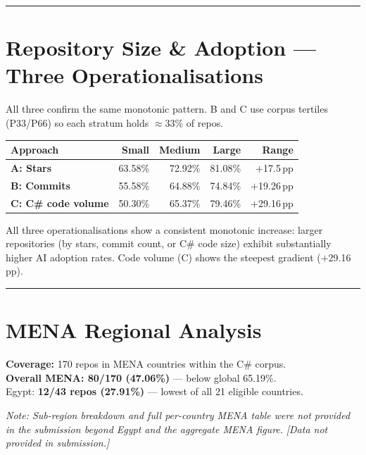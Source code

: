 \documentclass[10pt,a4paper]{article}
\begin{document}
\vspace{6pt}
\hrule
\vspace{6pt}

\newpage
\section*{Repository Size \& Adoption --- Three Operationalisations}

All three confirm the same monotonic pattern. B and C use corpus tertiles
(P33/P66) so each stratum holds $\approx$33\% of repos.

\vspace{3pt}
\begin{tabular}{@{}p{6.2cm}rrrr@{}}
\toprule
Approach & Small & Medium & Large & Range \\
\midrule
\textbf{A: Stars}
  & 63.58\% & 72.92\% & 81.08\% & $+$17.5\,pp \\[5pt]
\textbf{B: Commits}
  & 55.58\% & 64.88\% & 74.84\% & $+$19.26\,pp \\[5pt]
\textbf{C: C\# code volume}
  & 50.30\% & 65.37\% & 79.46\% & $+$29.16\,pp \\
\bottomrule
\end{tabular}

\vspace{4pt}
{\small All three operationalisations show a consistent monotonic increase:
larger repositories (by stars, commit count, or C\# code size) exhibit substantially
higher AI adoption rates. Code volume (C) shows the steepest gradient ($+$29.16\,pp).}

\vspace{6pt}
\hrule
\vspace{6pt}

\section*{MENA Regional Analysis}

\textbf{Coverage:} 170 repos in MENA countries within the C\# corpus.\\
\textbf{Overall MENA: 80/170 (47.06\%)} --- below global 65.19\%.\\
Egypt: \textbf{12/43 repos (27.91\%)} --- lowest of all 21 eligible countries.

\vspace{4pt}
\textit{Note: Sub-region breakdown and full per-country MENA table were not provided
in the submission beyond Egypt and the aggregate MENA figure.}
\textit{\small [Data not provided in submission.]}
\end{document}
